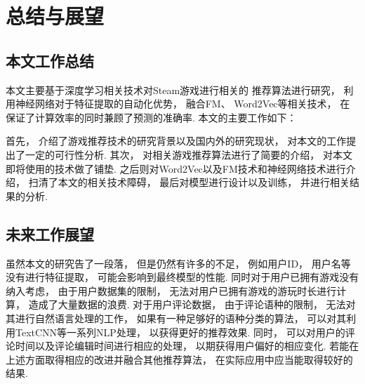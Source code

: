 \section{总结与展望}

\subsection{本文工作总结}

本文主要基于深度学习相关技术对Steam游戏进行相关的
推荐算法进行研究，
利用神经网络对于特征提取的自动化优势，
融合FM、
Word2Vec等相关技术，
在保证了计算效率的同时兼顾了预测的准确率.
本文的主要工作如下：

首先，
介绍了游戏推荐技术的研究背景以及国内外的研究现状，
对本文的工作提出了一定的可行性分析.
其次，
对相关游戏推荐算法进行了简要的介绍，
对本文即将使用的技术做了铺垫.
之后则对Word2Vec以及FM技术和神经网络技术进行介绍，
扫清了本文的相关技术障碍，
最后对模型进行设计以及训练，
并进行相关结果的分析.

\subsection{未来工作展望}

虽然本文的研究告了一段落，
但是仍然有许多的不足，
例如用户ID，
用户名等没有进行特征提取，
可能会影响到最终模型的性能.
同时对于用户已拥有游戏没有纳入考虑，
由于用户数据集的限制，
无法对用户已拥有游戏的游玩时长进行计算，
造成了大量数据的浪费.
对于用户评论数据，
由于评论语种的限制，
无法对其进行自然语言处理的工作，
如果有一种足够好的语种分类的算法，
可以对其利用TextCNN等一系列NLP处理，
以获得更好的推荐效果.
同时，
可以对用户的评论时间以及评论编辑时间进行相应的处理，
以期获得用户偏好的相应变化.
若能在上述方面取得相应的改进并融合其他推荐算法，
在实际应用中应当能取得较好的结果.